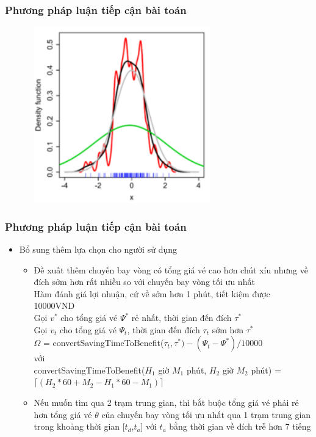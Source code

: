\documentclass{beamer}
\begin{document}
\begin{frame}
\frametitle{Phương pháp luận tiếp cận bài toán}
\begin{center}
\includegraphics[height=3in,width=4in]{220px-Comparison_of_1D_bandwidth_selectors.png}
\end{center}
\end{frame}

\begin{frame}
\frametitle{Phương pháp luận tiếp cận bài toán}
\begin{itemize}
\item Bổ sung thêm lựa chọn cho người sử dụng
\begin{itemize}
\item Đề xuất thêm chuyến bay vòng có tổng giá vé cao hơn chút xíu nhưng về đích sớm hơn rất nhiều so với chuyến bay vòng tối ưu nhất\\
Hàm đánh giá lợi nhuận, cứ về sớm hơn 1 phút, tiết kiệm được 10000VND\\
Gọi $v^*$ cho tổng giá vé $\Psi^*$ rẻ nhất, thời gian đến đích $\tau^*$\\
Gọi $v_t$ cho tổng giá vé $\Psi_t$, thời gian đến đích $\tau_t$ sớm hơn $\tau^*$\\
$\Omega$ = convertSavingTimeToBenefit($\tau_t, \tau^*) - (\Psi_t - \Psi^*)/10000$\\
với\\
convertSavingTimeToBenefit($H_{1}$ giờ $M_{1}$ phút, $H_{2}$ giờ $M_{2}$ phút) = $\lceil(H_{2}*60+M_{2}-H_{1}*60-M_{1})\rceil$\\
\item Nếu muốn tìm qua 2 trạm trung gian, thì bắt buộc tổng giá vé phải rẻ hơn tổng giá vé $\theta$ của chuyến bay vòng tối ưu nhất qua 1 trạm trung gian 
trong khoảng thời gian [$t_d$,$t_a$] với $t_a$ bằng thời gian về đích trễ hơn 7 tiếng
\end{itemize}
\end{itemize}
\end{frame}
\end{document}
